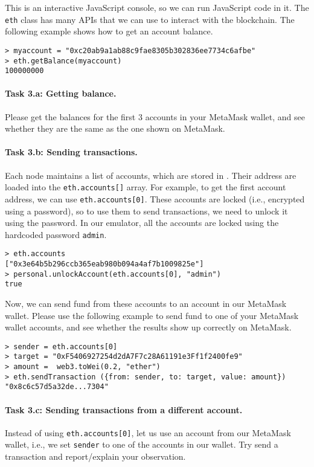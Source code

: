 This is an interactive JavaScript console, so we can run JavaScript code
in it. The \texttt{eth} class has many APIs that we can use
to interact with the blockchain. 
The following example shows
how to get an account balance. 

\begin{lstlisting}
> myaccount = "0xc20ab9a1ab88c9fae8305b302836ee7734c6afbe"
> eth.getBalance(myaccount)
100000000
\end{lstlisting}

\paragraph{Task 3.a: Getting balance.} 
Please get the balances for the first 3 accounts in your MetaMask
wallet, and see whether they are the same as the one shown on MetaMask.


\paragraph{Task 3.b: Sending transactions.} 
Each node maintains a list of accounts, which are
stored in .
Their address are loaded into the \texttt{eth.accounts[]} array.
For example, to get the first account address, we can use 
\texttt{eth.accounts[0]}. 
These accounts are locked (i.e., encrypted using a password), 
so to use them to send transactions, we need to unlock it using
the password. In our emulator, all the accounts are locked using
the hardcoded password \texttt{admin}. 


\begin{lstlisting}
> eth.accounts
["0x3e64b5b296ccb365eab980b094a4af7b1009825e"]
> personal.unlockAccount(eth.accounts[0], "admin")
true
\end{lstlisting}

Now, we can send fund from these accounts to an account in our 
MetaMask wallet. Please use the following example to send fund to
one of your MetaMask wallet accounts, and see whether the results
show up correctly on MetaMask. 

\begin{lstlisting}
> sender = eth.accounts[0]
> target = "0xF5406927254d2dA7F7c28A61191e3Ff1f2400fe9"
> amount =  web3.toWei(0.2, "ether")
> eth.sendTransaction ({from: sender, to: target, value: amount})
"0x8c6c57d5a32de...7304"
\end{lstlisting}
 

\paragraph{Task 3.c: Sending transactions from a different account.} 
Instead of using \texttt{eth.accounts[0]}, let us use an account from our 
MetaMask wallet, i.e., we set \texttt{sender} to one of the accounts in our 
wallet. Try send a transaction and report/explain your observation. 


